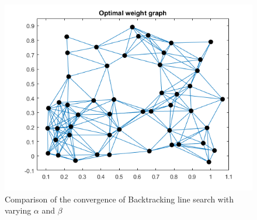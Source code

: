 \begin{enumerate}[(a)]
{\begin{figure}[h!]
\includegraphics[width=\textwidth]{source/part2/fig2}
\caption{Comparison of the convergence of Backtracking line search with varying $\alpha$ and $\beta$}
\end{figure}}
\end{enumerate}
